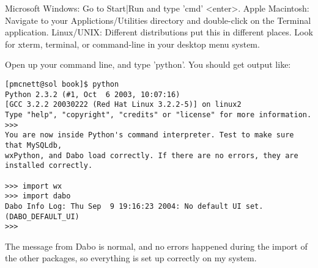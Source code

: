 Microsoft Windows: Go to Start|Run and type 'cmd' <enter>.
Apple Macintosh: Navigate to your Applictions/Utilities directory and double-click on 
the Terminal application.
Linux/UNIX: Different distributions put this in different places. Look for xterm, terminal, 
or command-line in your desktop menu system.
	
Open up your command line, and type 'python'. You should get output like:	%
\begin{verbatim}
[pmcnett@sol book]$ python
Python 2.3.2 (#1, Oct  6 2003, 10:07:16)
[GCC 3.2.2 20030222 (Red Hat Linux 3.2.2-5)] on linux2
Type "help", "copyright", "credits" or "license" for more information.
>>>
You are now inside Python's command interpreter. Test to make sure that MySQLdb,
wxPython, and Dabo load correctly. If there are no errors, they are installed correctly.

>>> import wx
>>> import dabo
Dabo Info Log: Thu Sep  9 19:16:23 2004: No default UI set. (DABO_DEFAULT_UI)
>>>
\end{verbatim}
The message from Dabo is normal, and no errors happened during the import of the 
other packages, so everything is set up correctly on my system. 
